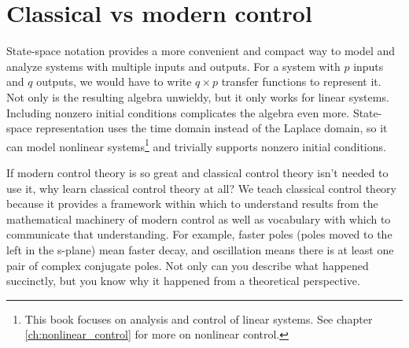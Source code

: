 \section{Classical vs modern control}

State-space notation provides a more convenient and compact way to model and
analyze \glspl{system} with multiple \glspl{input} and \glspl{output}. For a
\gls{system} with $p$ \glspl{input} and $q$ \glspl{output}, we would have to
write $q \times p$ transfer functions to represent it. Not only is the resulting
algebra unwieldy, but it only works for linear \glspl{system}. Including nonzero
initial conditions complicates the algebra even more. State-space representation
uses the time domain instead of the Laplace domain, so it can model nonlinear
\glspl{system}\footnote{This book focuses on analysis and control of linear
\glspl{system}. See chapter \ref{ch:nonlinear_control} for more on nonlinear
control.} and trivially supports nonzero initial conditions.

If modern control theory is so great and classical control theory isn't needed
to use it, why learn classical control theory at all? We teach classical control
theory because it provides a framework within which to understand results from
the mathematical machinery of modern control as well as vocabulary with which to
communicate that understanding. For example, faster poles (poles moved to the
left in the s-plane) mean faster decay, and oscillation means there is at least
one pair of complex conjugate poles. Not only can you describe what happened
succinctly, but you know why it happened from a theoretical perspective.
